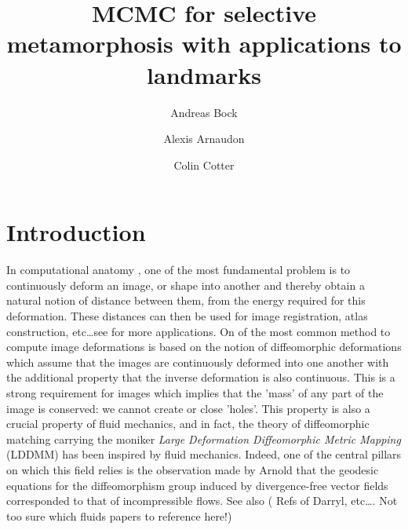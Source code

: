 \documentclass[runningheads]{llncs}
\begin{document}
%
\title{MCMC for selective metamorphosis with applications to landmarks}
%
%
\author{Andreas Bock \and  Alexis Arnaudon \and Colin Cotter}
%
%
%
\maketitle              %

\begin{abstract}


\end{abstract}

\section{Introduction}

In computational anatomy
\cite{grenander1994representations,grenander1998computational}, one of the most
fundamental problem is to continuously deform an image, or shape into another
and thereby obtain a natural notion of distance between them, from the energy
required for this deformation.  These distances can then be used for image
registration, atlas construction, etc\dots see \cite{todo} for more
applications. On of the most common method to compute image deformations is
based on the notion of diffeomorphic deformations which assume that the images
are continuously deformed into one another with the additional property that the
inverse deformation is also continuous.  This is a strong requirement for images
which implies that the 'mass' of any part of the image is conserved: we cannot
create or close 'holes'.  This property is also a crucial property of fluid
mechanics, and in fact, the theory of diffeomorphic matching carrying the
moniker \emph{Large Deformation Diffeomorphic Metric Mapping}
\cite{trouve1998diffeomorphisms,beg2005computing} (LDDMM) has been inspired by
fluid mechanics. Indeed, one of the central pillars on which this field relies
is the observation made by Arnold \cite{arnold1966geometrie} that the geodesic
equations for the diffeomorphism group induced by divergence-free vector fields
corresponded to that of incompressible flows. See also ({\color{red} Refs of
Darryl, etc\dots.}{\color{green} Not too sure which fluids papers to reference
here!}) 
\end{document}
